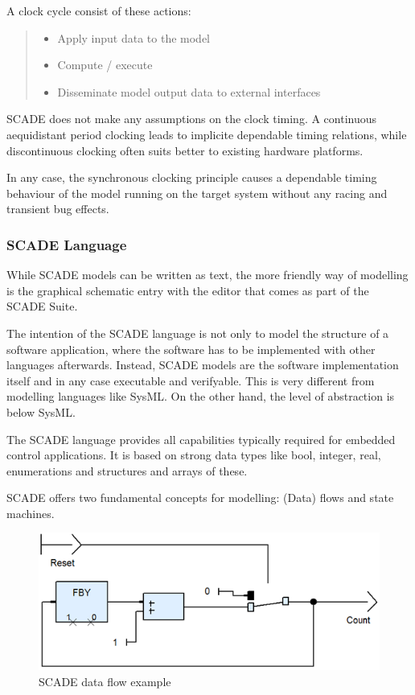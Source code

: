 \documentclass{template/openetcs_article}
\begin{document}
A clock cycle consist of these actions:
\begin{quote}
\begin{itemize}
	\item Apply input data to the model
	\item Compute / execute
	\item Disseminate model output data to external interfaces
\end{itemize}
\end{quote}

SCADE does not make any assumptions on the clock timing. A continuous aequidistant period clocking leads to implicite dependable timing relations, while discontinuous clocking often suits better to existing hardware platforms.  

In any case, the synchronous clocking principle causes a dependable timing behaviour of the model running on the target system without any racing and transient bug effects.


\subsubsection{SCADE Language}
\label{sec:SCADELanguage}

While SCADE models can be written as text, the more friendly way of modelling is the graphical schematic entry with the editor that comes as part of the SCADE Suite.

The intention of the SCADE language is not only to model the structure of a software application, where the software has to be implemented with other languages afterwards. Instead, SCADE models are the software implementation itself and in any case executable and verifyable. This is very different from modelling languages like SysML. On the other hand, the level of abstraction is below SysML.

The SCADE language provides all capabilities typically required for embedded control applications. It 
is based on strong data types like bool, integer, real, enumerations and structures and arrays of these. 

SCADE offers two fundamental concepts for modelling: (Data) flows and state machines.

\begin{figure}[htbp]
	\centering
		\includegraphics{DataFlow.png}
	\caption{SCADE data flow example}
	\label{fig:DataFlow}
\end{figure}
\end{document}
